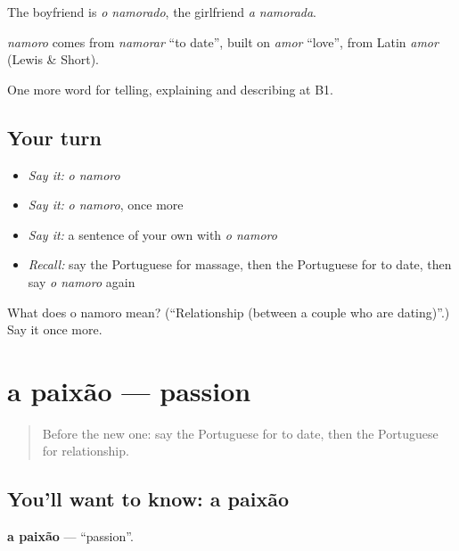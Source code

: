 The boyfriend is \emph{o namorado}, the girlfriend \emph{a namorada}.

\begin{cousinweb}
\emph{namoro} comes from \emph{namorar} \textquotedblleft{}to date\textquotedblright{}, built on \emph{amor} \textquotedblleft{}love\textquotedblright{}, from Latin \emph{amor} (Lewis \& Short).
\end{cousinweb}

\begin{grammarlens}[title={What you've built}]
One more word for telling, explaining and describing at B1.
\end{grammarlens}

\subsection*{Your turn}
\begin{itemize}
\raggedright
  \item \emph{Say it:} \emph{o namoro}
  \item \emph{Say it:} \emph{o namoro}, once more
  \item \emph{Say it:} a sentence of your own with \emph{o namoro}
  \item \emph{Recall:} say the Portuguese for massage, then the Portuguese for to date, then say \emph{o namoro} again
\end{itemize}

\begin{tcolorbox}[breakable,colback=teal!4,colframe=teal!35!black,title={Before you move on}]
What does o namoro mean? (\textquotedblleft{}Relationship (between a couple who are dating)\textquotedblright{}.) Say it once more.
\end{tcolorbox}
\section[a paixão]{a paixão — passion}

\label{lesson:PT-C491-paixao}



\begin{quote}
Before the new one: say the Portuguese for to date, then the Portuguese for relationship.
\end{quote}

\subsection*{You'll want to know: a paixão}
\textbf{a paixão} — \textquotedblleft{}passion\textquotedblright{}.

